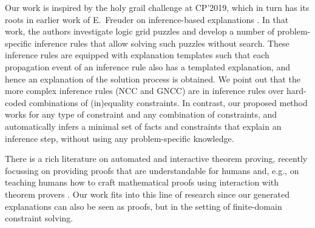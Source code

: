 Our work is inspired by the holy grail challenge at CP'2019, which in turn has its roots in earlier work of E.~Freuder on inference-based explanations \cite{sqalli1996inference}. In that work, the authors investigate logic grid puzzles and develop a number of problem-specific inference rules that allow solving such puzzles without search. These inference rules are equipped with explanation templates such that each propagation event of an inference rule also has a templated explanation, and hence an explanation of the solution process is obtained. We point out that the more complex inference rules (NCC and GNCC) are in inference rules over hard-coded combinations of (in)equality constraints. In contrast, our proposed method works for any type of constraint and any combination of constraints, and automatically infers a minimal set of facts and constraints that explain an inference step, without using any problem-specific knowledge. %



There is a rich literature on automated and interactive theorem proving, recently focussing on providing proofs that are understandable for humans \cite{Ganesalingam2017} and, e.g.,  on teaching humans how to craft mathematical proofs using interaction with theorem provers \cite{DBLP:conf/icml/YangD19}. 
Our work fits into this line of research since our generated explanations can also be seen as proofs, but in the setting of finite-domain constraint solving.




